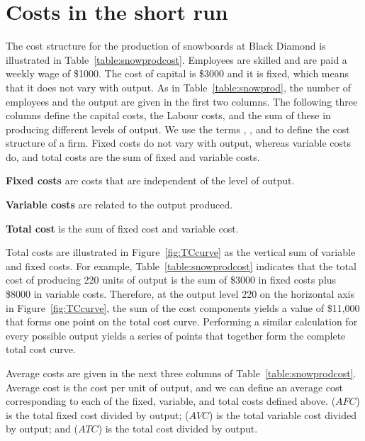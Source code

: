 \section{Costs in the short run}\label{sec:ch8sec4}

The cost structure for the production of snowboards at Black Diamond is illustrated in Table~\ref{table:snowprodcost}. Employees are skilled and are paid a weekly wage of \$1000. The cost of capital is \$3000 and it is fixed, which means that it does not vary with output. As in Table~\ref{table:snowprod}, the number of employees and the output are given in the first two columns. The following three columns define the capital costs, the Labour costs, and the sum of these in producing different levels of output. We use the terms , , and  to define the cost structure of a firm. Fixed costs do not vary with output, whereas variable costs do, and total costs are the sum of fixed and variable costs.

\begin{DefBox}
\textbf{Fixed costs} are costs that are independent of the level of output.

\textbf{Variable costs} are related to the output produced.

\textbf{Total cost} is the sum of fixed cost and variable cost.
\end{DefBox}

Total costs are illustrated in Figure~\ref{fig:TCcurve} as the vertical sum of variable and fixed costs. For example, Table~\ref{table:snowprodcost} indicates that the total cost of producing 220 units of output is the sum of \$3000 in fixed costs plus \$8000 in variable costs. Therefore, at the output level 220 on the horizontal axis in Figure~\ref{fig:TCcurve}, the sum of the cost components yields a value of \$11,000 that forms one point on the total cost curve. Performing a similar calculation for every possible output yields a series of points that together form the complete total cost curve.



Average costs are given in the next three columns of Table~\ref{table:snowprodcost}. Average cost is the cost per unit of output, and we can define an average cost corresponding to each of the fixed, variable, and total costs defined above.  ($AFC$) is the total fixed cost divided by output;  ($AVC$) is the total variable cost divided by output; and  ($ATC$) is the total cost divided by output.


